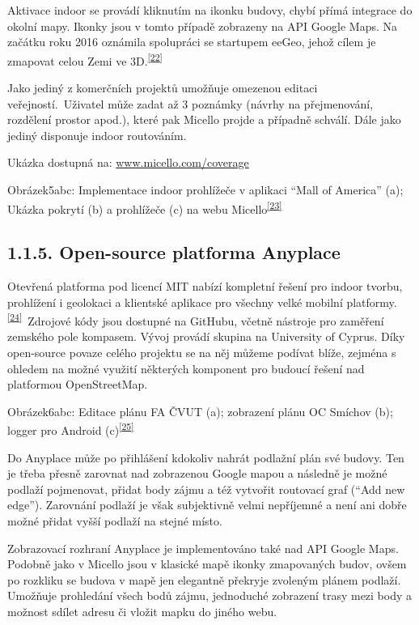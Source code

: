 Aktivace indoor se provádí kliknutím na ikonku budovy, chybí přímá integrace do okolní mapy. Ikonky jsou v tomto případě zobrazeny na API Google Maps. Na začátku roku 2016 oznámila spolupráci se startupem eeGeo, jehož cílem je zmapovat celou Zemi ve 3D.\textsuperscript{\href{}{{[}22{]}}}

Jako jediný z komerčních projektů umožňuje omezenou editaci veřejností.~Uživatel může zadat až 3 poznámky (návrhy na přejmenování, rozdělení prostor apod.), které pak Micello projde a případně schválí. Dále jako jediný disponuje indoor routováním.

Ukázka dostupná na: \href{}{www.micello.com/coverage}~

Obrázek5abc: Implementace indoor prohlížeče v aplikaci ``Mall of America'' (a); Ukázka pokrytí (b) a prohlížeče (c) na webu Micello\textsuperscript{\href{}{{[}23{]}}}

\subsection{1.1.5. Open-source platforma Anyplace}\label{open-source-platforma-anyplace}

Otevřená platforma pod licencí MIT nabízí kompletní řešení pro indoor tvorbu, prohlížení i geolokaci a klientské aplikace pro všechny velké mobilní platformy.\textsuperscript{\href{}{{[}24{]}}}~Zdrojové kódy jsou dostupné na GitHubu, včetně nástroje pro zaměření zemského pole kompasem. Vývoj provádí skupina na University of Cyprus. Díky open-source povaze celého projektu se na něj můžeme podívat blíže, zejména s ohledem na možné využití některých komponent pro budoucí řešení nad platformou OpenStreetMap.

Obrázek6abc: Editace plánu FA ČVUT (a); zobrazení plánu OC Smíchov (b); logger pro Android (c)\textsuperscript{\href{}{{[}25{]}}}

Do Anyplace může po přihlášení kdokoliv nahrát podlažní plán své budovy. Ten je třeba přesně zarovnat nad zobrazenou Google mapou a následně je možné podlaží pojmenovat, přidat body zájmu a též vytvořit routovací graf (``Add new edge''). Zarovnání podlaží je však subjektivně velmi nepříjemné a není ani dobře možné přidat vyšší podlaží na stejné místo.

Zobrazovací rozhraní Anyplace je implementováno také nad API Google Maps. Podobně jako v Micello jsou v klasické mapě ikonky zmapovaných budov, ovšem po rozkliku se budova v mapě jen elegantně překryje zvoleným plánem podlaží. Umožňuje prohledání všech bodů zájmu, jednoduché zobrazení trasy mezi body a možnost sdílet adresu či vložit mapku do jiného webu.

